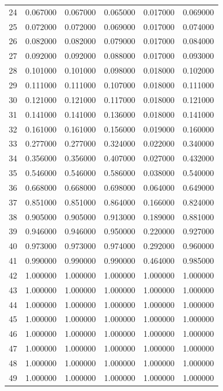\begin{tabular}{lrrrrr}
24 & 0.067000 & 0.067000 & 0.065000 & 0.017000 & 0.069000 \\
25 & 0.072000 & 0.072000 & 0.069000 & 0.017000 & 0.074000 \\
26 & 0.082000 & 0.082000 & 0.079000 & 0.017000 & 0.084000 \\
27 & 0.092000 & 0.092000 & 0.088000 & 0.017000 & 0.093000 \\
28 & 0.101000 & 0.101000 & 0.098000 & 0.018000 & 0.102000 \\
29 & 0.111000 & 0.111000 & 0.107000 & 0.018000 & 0.111000 \\
30 & 0.121000 & 0.121000 & 0.117000 & 0.018000 & 0.121000 \\
31 & 0.141000 & 0.141000 & 0.136000 & 0.018000 & 0.141000 \\
32 & 0.161000 & 0.161000 & 0.156000 & 0.019000 & 0.160000 \\
33 & 0.277000 & 0.277000 & 0.324000 & 0.022000 & 0.340000 \\
34 & 0.356000 & 0.356000 & 0.407000 & 0.027000 & 0.432000 \\
35 & 0.546000 & 0.546000 & 0.586000 & 0.038000 & 0.540000 \\
36 & 0.668000 & 0.668000 & 0.698000 & 0.064000 & 0.649000 \\
37 & 0.851000 & 0.851000 & 0.864000 & 0.166000 & 0.824000 \\
38 & 0.905000 & 0.905000 & 0.913000 & 0.189000 & 0.881000 \\
39 & 0.946000 & 0.946000 & 0.950000 & 0.220000 & 0.927000 \\
40 & 0.973000 & 0.973000 & 0.974000 & 0.292000 & 0.960000 \\
41 & 0.990000 & 0.990000 & 0.990000 & 0.464000 & 0.985000 \\
42 & 1.000000 & 1.000000 & 1.000000 & 1.000000 & 1.000000 \\
43 & 1.000000 & 1.000000 & 1.000000 & 1.000000 & 1.000000 \\
44 & 1.000000 & 1.000000 & 1.000000 & 1.000000 & 1.000000 \\
45 & 1.000000 & 1.000000 & 1.000000 & 1.000000 & 1.000000 \\
46 & 1.000000 & 1.000000 & 1.000000 & 1.000000 & 1.000000 \\
47 & 1.000000 & 1.000000 & 1.000000 & 1.000000 & 1.000000 \\
48 & 1.000000 & 1.000000 & 1.000000 & 1.000000 & 1.000000 \\
49 & 1.000000 & 1.000000 & 1.000000 & 1.000000 & 1.000000 \\

\end{tabular}
